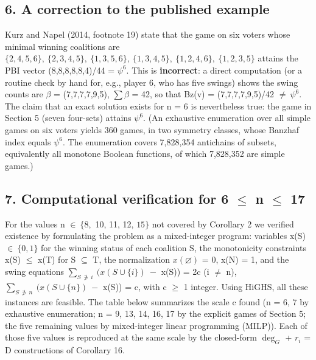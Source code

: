 \documentclass[
]{article}
\begin{document}
\subsection{6. A correction to the published
example}\label{a-correction-to-the-published-example}

Kurz and Napel (2014, footnote 19) state that the game on six voters
whose minimal winning coalitions are
\(\{2,4,5,6\},\allowbreak\ \{2,3,4,5\},\allowbreak\ \{1,3,5,6\},\allowbreak\ \{1,3,4,5\},\allowbreak\ \{1,2,4,6\},\allowbreak\ \{1,2,3,5\}\)
attains the PBI vector (8,8,8,8,8,4)/44 = \(\psi^6.\) This is
\textbf{incorrect}: a direct computation (or a routine check by hand
for, e.g., player 6, who has five swings) shows the swing counts are
\(\beta\) = (7,7,7,7,9,5), \(\sum\beta\) = 42, so that Bz(v) =
(7,7,7,7,9,5)/42 \(\ne\ \psi^6.\) The claim that an exact solution
exists for n = 6 is nevertheless true: the game in Section 5 (seven
four-sets) attains \(\psi^6.\) (An exhaustive enumeration over all
simple games on six voters yields 360 games, in two symmetry classes,
whose Banzhaf index equals \(\psi^6.\) The enumeration covers 7,828,354
antichains of subsets, equivalently all monotone Boolean functions, of
which 7,828,352 are simple games.)

\subsection{\texorpdfstring{7. Computational verification for 6 \(\le\)
n \(\le\)
17}{7. Computational verification for 6 \textbackslash le n \textbackslash le 17}}\label{computational-verification-for-6-n-17}

For the values n \(\in\ \{8,\) 10, 11, 12, \(15\}\) not covered by
Corollary 2 we verified existence by formulating the problem as a
mixed-integer program: variables x(S) \(\in\ \{0,1\}\) for the winning
status of each coalition S, the monotonicity constraints x(S) \(\le\)
x(T) for S \(\subseteq\) T, the normalization \(x(\varnothing)\) = 0,
x(N) = 1, and the swing equations
\(\sum_{S\ \not\ni\ i}\ (x(S\cup\{i\})\ -\) x(S)) = 2c (i \(\ne\) n),
\(\sum_{S\ \not\ni\ n}\ (x(S\cup\{n\})\ -\) x(S)) = c, with c \(\ge\) 1
integer. Using HiGHS, all these instances are feasible. The table below
summarizes the scale c found (n = 6, 7 by exhaustive enumeration; n = 9,
13, 14, 16, 17 by the explicit games of Section 5; the five remaining
values by mixed-integer linear programming (MILP)). Each of those five
values is reproduced at the same scale by the closed-form \(\deg_G\) +
\(r_i\) = D constructions of Corollary 16.
\end{document}
